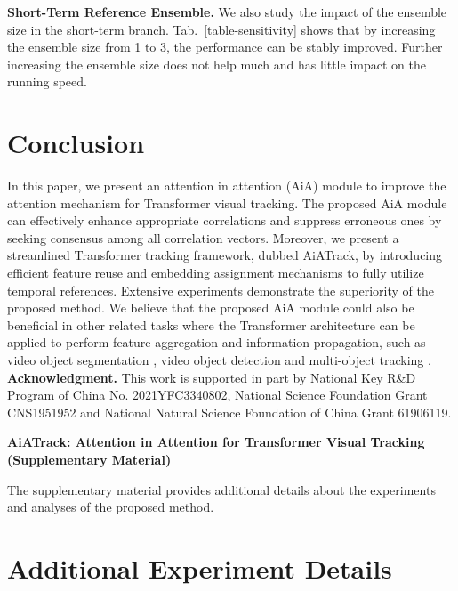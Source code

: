 \noindent\textbf{Short-Term Reference Ensemble.} We also study the impact of the ensemble size in the short-term branch. Tab.~\ref{table-sensitivity} shows that by increasing the ensemble size from 1 to 3, the performance can be stably improved. Further increasing the ensemble size does not help much and has little impact on the running speed.

\section{Conclusion}
In this paper, we present an attention in attention (AiA) module to improve the attention mechanism for Transformer visual tracking. The proposed AiA module can effectively enhance appropriate correlations and suppress erroneous ones by seeking consensus among all correlation vectors. Moreover, we present a streamlined Transformer tracking framework, dubbed AiATrack, by introducing efficient feature reuse and embedding assignment mechanisms to fully utilize temporal references. Extensive experiments demonstrate the superiority of the proposed method. We believe that the proposed AiA module could also be beneficial in other related tasks where the Transformer architecture can be applied to perform feature aggregation and information propagation, such as video object segmentation \cite{yang2021associating,lan2021siamese,duke2021sstvos,mao2021joint}, video object detection \cite{he2021end} and multi-object tracking \cite{sun2020transtrack,meinhardt2021trackformer,zhang2021bytetrack}. \\

\noindent\textbf{Acknowledgment.} This work is supported in part by National Key R\&D Program of China No. 2021YFC3340802, National Science Foundation Grant CNS1951952 and National Natural Science Foundation of China Grant 61906119.

\clearpage

\begin{center}
\textbf{\large AiATrack: Attention in Attention for Transformer Visual Tracking (Supplementary Material)}
\end{center}

The supplementary material provides additional details about the experiments and analyses of the proposed method.

\section{Additional Experiment Details}

